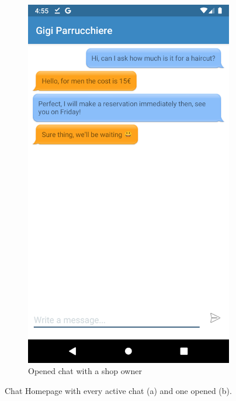 \begin{figure}[h]
\begin{subfigure}{.5\textwidth}
  \includegraphics[height=.4\textheight, keepaspectratio=true]{Img/Screens/Chat}
  \caption{Opened chat with a shop owner}
\end{subfigure}%
\caption{Chat Homepage with every active chat (a) and one opened (b).}
\end{figure}

